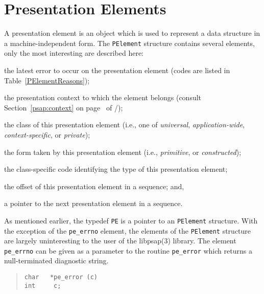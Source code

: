 \section	{Presentation Elements}
A presentation element is an object which is used to represent a
data structure in a machine-independent form.
The \verb"PElement" structure contains several elements,
only the most interesting are described here:
\begin{describe}
\item[\verb"pe\_errno":] the latest error to occur on the presentation element
(codes are listed in Table~\ref{PElementReasons});

\item[\verb"pe\_context":] the presentation context to which the element
belongs (consult Section~\ref{psap:context} on page~\pageref{psap:context} of
\voltwo/);

\item[\verb"pe\_class":] the class of this presentation element
(i.e., one of {\em universal}, {\em application-wide}, {\em context-specific},
or {\em private\/});

\item[\verb"pe\_form":] the form taken by this presentation element
(i.e., {\em primitive}, or {\em constructed\/});

\item[\verb"pe\_id":] the class-specific code identifying the type of this
presentation element;

\item[\verb"pe\_offset":] the offset of this presentation element in a
sequence;
and,

\item[\verb"pe\_next":] a pointer to the next presentation element in a
sequence.
\end{describe}
As mentioned earlier,
the typedef \verb"PE" is a pointer to an \verb"PElement" structure.
With the exception of the \verb"pe_errno" element,
the elements of the \verb"PElement" structure are largely uninteresting to
the user of the \man libpsap(3) library.
The element \verb"pe_errno"
can be given as a parameter to the routine \verb"pe_error" which returns a
null-terminated diagnostic string.
\begin{quote}\small\begin{verbatim}
char   *pe_error (c)
int     c;
\end{verbatim}\end{quote}

